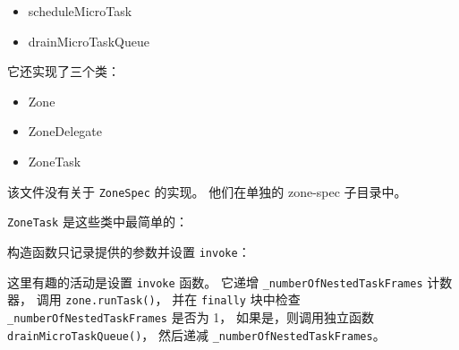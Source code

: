\begin{itemize}
  \item scheduleMicroTask
  \item drainMicroTaskQueue
\end{itemize}


它还实现了三个类：

\begin{itemize}
  \item Zone
  \item ZoneDelegate
  \item ZoneTask
\end{itemize}


该文件没有关于 \texttt{ZoneSpec} 的实现。
他们在单独的 zone-spec 子目录中。


\texttt{ZoneTask} 是这些类中最简单的：




构造函数只记录提供的参数并设置 \texttt{invoke}：




这里有趣的活动是设置 \texttt{invoke} 函数。
它递增 \texttt{\_numberOfNestedTaskFrames} 计数器，
调用 \texttt{zone.runTask()}，
并在 \texttt{finally} 块中检查 \texttt{\_numberOfNestedTaskFrames} 是否为 1，
如果是，则调用独立函数 \texttt{drainMicroTaskQueue()}，
然后递减 \texttt{\_numberOfNestedTaskFrames}。




